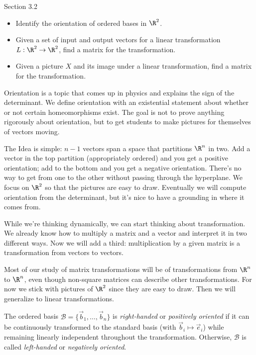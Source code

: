 \documentclass{problemset}
\begin{document}
\begin{lesson}
	\newpage

	Section 3.2

	\begin{itemize}
		\item Identify the orientation of ordered bases in $\R^2$.
		\item Given a set of input and output vectors for a 
			linear transformation $L:\R^2\to\R^2$, find 
			a matrix for the transformation.
		\item Given a picture $X$ and its image under a linear transformation,
			find a matrix for the transformation.
	\end{itemize}

	Orientation is a topic that comes up in physics and explains the sign
	of the determinant. We define orientation with an existential statement
	about whether or not certain homeomorphisms exist. The goal is not to
	prove anything rigorously about orientation, but to get students to
	make pictures for themselves of vectors moving.

	The Idea is simple: $n-1$ vectors span a space that partitions $\R^n$ in
	two. Add a vector in the top partition (appropriately ordered) and you get
	a positive orientation; add to the bottom and you get a negative orientation.
	There's no way to get from one to the other without passing through the
	hyperplane. We focus on $\R^2$ so that the pictures are easy to draw. 
	Eventually we will compute orientation from the determinant, but it's nice
	to have a grounding in where it comes from.

	While we're thinking dynamically, we can start thinking about transformation.
	We already know how to multiply a matrix and a vector and interpret it in
	two different ways. Now we will add a third: multiplication by a given
	matrix is a transformation from vectors to vectors.

	Most of our study of matrix transformations will be of transformations from $\R^n$
	to $\R^n$, even though non-square matrices can describe other transformations.
	For now we stick with pictures of $\R^2$ since they are easy to draw. Then
	we will generalize to linear transformations.

	\newpage
\end{lesson}

	\begin{definition}
		The ordered basis $\mathcal B=\{\vec b_1,\ldots,\vec b_n\}$ is \emph{right-handed}
		or \emph{positively oriented} if it can be continuously transformed to 
		the standard basis (with $\vec b_i\mapsto \vec e_i$) while remaining 
		linearly independent throughout the transformation. Otherwise, $\mathcal B$ 
		is called \emph{left-handed} or \emph{negatively oriented}.
	\end{definition}
\end{document}
